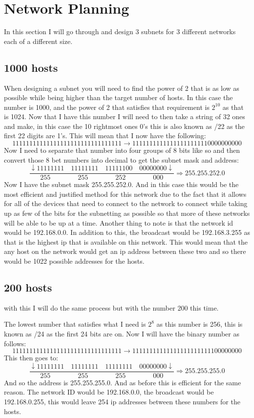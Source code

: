 \documentclass{article}
\begin{document}
\section{Network Planning}
In this section I will go through and design 3 subnets for 3 different networks each of a different size.
\subsection{1000 hosts}
When designing a subnet you will need to find the power of 2 that is as low as possible while being higher than the target number of hosts. In this case the number is 1000, and the power of 2 that satisfies that requirement is $2^{10}$ as that is 1024. Now that I have this number I will need to then take a string of 32 ones and make, in this case the 10 rightmost ones 0's this is also known as /22 as the first 22 digits are 1's. This will mean that I now have the following:
\[
	11111111111111111111111111111111 \rightarrow 11111111111111111111110000000000
\]
Now I need to separate that number into four groups of 8 bits like so and then convert those 8 bet numbers into decimal to get the subnet mask and address:
\[
	\frac{\downarrow11111111\quad11111111\quad11111100\quad00000000\downarrow}{255 \qquad \qquad 255 \qquad \qquad 252 \qquad \qquad 000} \Rightarrow 255.255.252.0
\]
Now I have the subnet mask 255.255.252.0. And in this case this would be the most efficient and justified method for this network due to the fact that it allows for all of the devices that need to connect to the network to connect while taking up as few of the bits for the subnetting as possible so that more of these networks will be able to be up at a time. 
Another thing to note is that the network id would be 192.168.0.0. In addition to this, the broadcast would be 192.168.3.255 as that is the highest ip that is available on this network. This would mean that the any host on the network would get an ip address between these two and so there would be 1022 possible addresses for the hosts. 
\subsection{200 hosts}
with this I will do the same process but with the number 200 this time. 
	
The lowest number that satisfies what I need is $2^{8}$ as this number is 256, this is known as /24 as the first 24 bits are on. Now I will have the binary number as follows:
\[
	11111111111111111111111111111111 \rightarrow 11111111111111111111111100000000
\]
This then goes to:
\[
	\frac{\downarrow11111111\quad11111111\quad11111111\quad00000000\downarrow}{255 \qquad \qquad 255 \qquad \qquad 255 \qquad \qquad 000} \Rightarrow 255.255.255.0
\]
And so the address is 255.255.255.0. And as before this is efficient for the same reason. 
The network ID would be 192.168.0.0, the broadcast would be 192.168.0.255, this would leave 254 ip addresses between these numbers for the hosts. 
\end{document}
